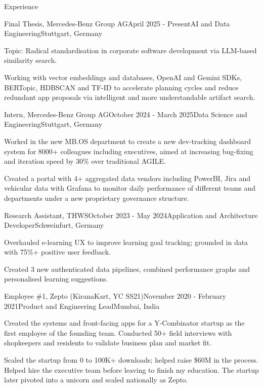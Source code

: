 \documentclass[
	a4paper, %
    10pt, %
]{resume} %
\begin{document}
\begin{rSection}{Experience}

	\begin{rSubsection}{Final Thesis, Mercedes-Benz Group AG}{April 2025 - Present}{AI and Data Engineering}{Stuttgart, Germany}
		\item Topic: Radical standardisation in corporate software development via LLM-based similarity search.
		\item Working with vector embeddings and databases, OpenAI and Gemini SDKs, BERTopic, HDBSCAN and TF-ID to accelerate planning cycles and reduce redundant app proposals via intelligent and more understandable artifact search.
	\end{rSubsection}


	\begin{rSubsection}{Intern, Mercedes-Benz Group AG}{October 2024 - March 2025}{Data Science and Engineering}{Stuttgart, Germany}
		\item Worked in the new MB.OS department to create a new dev-tracking dashboard system for 8000+ colleagues including executives, aimed at increasing bug-fixing and iteration speed by 30\% over traditional AGILE.
		\item Created a portal with 4+ aggregated data vendors including PowerBI, Jira and vehicular data with Grafana to monitor daily performance of different teams and departments under a new proprietary governance structure.
	\end{rSubsection}


	\begin{rSubsection}{Research Assistant, THWS}{October 2023 - May 2024}{Application and Architecture Developer}{Schweinfurt, Germany}
		\item Overhauled e-learning UX to improve learning goal tracking; grounded in data with 75\%+ positive user feedback.
		\item Created 3 new authenticated data pipelines, combined performance graphs and personalised learning suggestions.
	\end{rSubsection}


	\begin{rSubsection}{Employee \#1, Zepto (KiranaKart, YC SS21)}{November 2020 - February 2021}{Product and Engineering Lead}{Mumbai, India}
		\item Created the systems and front-facing apps for a Y-Combinator startup as the first employee of the founding team. Conducted 50+ field interviews with shopkeepers and residents to validate business plan and market fit.
		\item Scaled the startup from 0 to 100K+ downloads; helped raise \$60M in the process. Helped hire the executive team before leaving to finish my education. The startup later pivoted into a unicorn and scaled nationally as Zepto.
	\end{rSubsection}


\end{rSection}
\end{document}
